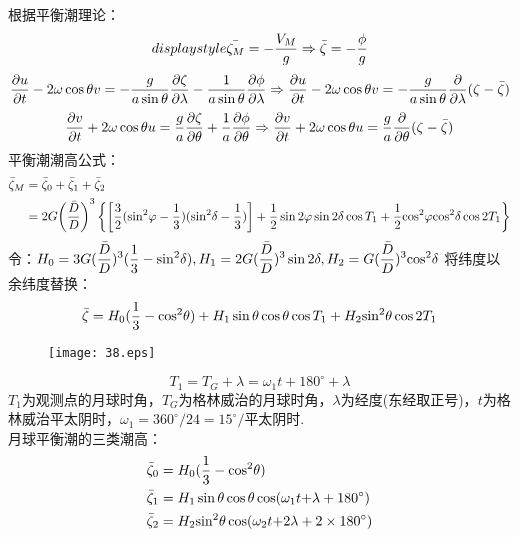 \documentclass[a4paper,12pt]{article}
\begin{document}
    根据平衡潮理论：\\
    $$displaystyle \bar{\zeta_M}=-{V_M \over g}\Rightarrow \bar{\zeta}=-{\phi \over g}$$
    \[
        {{\partial u} \over {\partial t}} - 2\omega \cos \theta v =  - {g \over {a\sin \theta }}{{\partial \zeta } \over {\partial \lambda }} - {1 \over {a\sin \theta }}{{\partial \phi } \over {\partial \lambda }}\Rightarrow {{\partial u} \over {\partial t}} - 2\omega \cos \theta v =  - {g \over {a\sin \theta }}{\partial  \over {\partial \lambda }}(\zeta  - \bar \zeta )
    \]
    \[
        {{\partial v} \over {\partial t}} + 2\omega \cos \theta u = {g \over a}{{\partial \zeta } \over {\partial \theta }} + {1 \over a}{{\partial \phi } \over {\partial \theta }}\Rightarrow {{\partial v} \over {\partial t}} + 2\omega \cos \theta u = {g \over a}{\partial  \over {\partial \theta }}(\zeta  - \bar \zeta )
    \]
    平衡潮潮高公式：
    \[
        \begin{aligned}
            {{\bar \zeta }_M} &= {{\bar \zeta }_0} + {{\bar \zeta }_1} + {{\bar \zeta }_2}\\
            &= 2G{\left( {{{\bar D} \over D}} \right)^3}\left\{\left[ {3 \over 2}({{\sin }^2}\varphi  - {1 \over 3})({{\sin }^2}\delta  - {1 \over 3}) \right]  +{1 \over 2}\sin 2\varphi \sin 2\delta \cos {T_1} + {1 \over 2}{\cos ^2}\varphi {\cos ^2}\delta \cos 2T_1\right\}
        \end{aligned}
    \]
    令：$\displaystyle {H_0} = 3G{({{\bar D} \over D})^3}({1 \over 3} - {\sin ^2}\delta ),{H_1} = 2G{({{\bar D} \over D})^3}\sin 2\delta ,{H_2} = G{({{\bar D} \over D})^3}{\cos ^2}\delta $
    将纬度以余纬度替换：
    \[
        \bar \zeta  = {H_0}({1 \over 3} - {\cos ^2}\theta ) + {H_1}\sin \theta \cos \theta \cos {T_1} + {H_2}{\sin ^2}\theta \cos 2{T_1}
    \]
    \begin{figure}[H]
        \centering \texttt{[image: 38.eps]}
        \caption*{}
    \end{figure}
    \[
        T_1=T_G+\lambda=\omega_1 t+180^\circ +\lambda
    \]
    $T_1$为观测点的月球时角，$T_G$为格林威治的月球时角，$\lambda$为经度(东经取正号)，$t$为格林威治平太阴时，${\omega _1} = {360^ \circ }/24 = {15^ \circ }/$平太阴时.\\
    月球平衡潮的三类潮高：
    \[
        \begin{aligned}
            &{\bar \zeta _0} = {H_0}({1 \over 3} - {\cos ^2}\theta )\\
            &{\bar \zeta _1} = {H_1}\sin \theta \cos \theta \cos ({\omega _1}t{\rm{ + }}\lambda  + {180^ \circ })\\
            &{\bar \zeta _2} = {H_2}{\sin ^2}\theta \cos ({\omega _2}t{\rm{ + }}2\lambda  + 2 \times {180^ \circ })
        \end{aligned}
    \]
\end{document}

